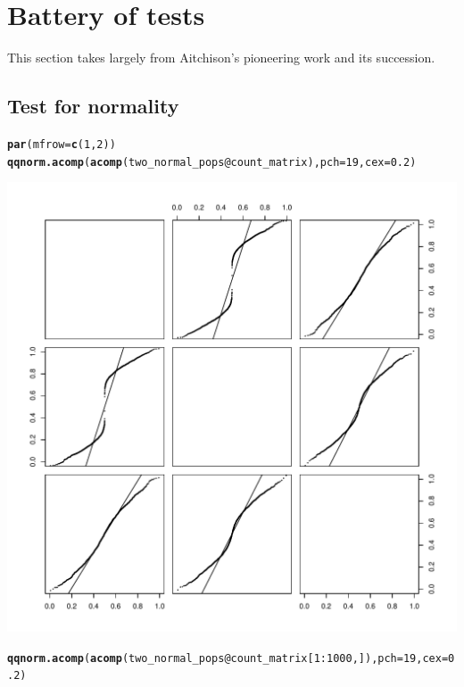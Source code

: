 \documentclass{article}\usepackage[]{graphicx}\usepackage[]{color}
\makeatletter
\def\maxwidth{ %
  \ifdim\Gin@nat@width>\linewidth
    \linewidth
  \else
    \Gin@nat@width
  \fi
}
\newcommand{\hlnum}[1]{\textcolor[rgb]{0.686,0.059,0.569}{#1}}%
\newcommand{\hlopt}[1]{\textcolor[rgb]{0,0,0}{#1}}%
\newcommand{\hlstd}[1]{\textcolor[rgb]{0.345,0.345,0.345}{#1}}%
\newcommand{\hlkwc}[1]{\textcolor[rgb]{0.333,0.667,0.333}{#1}}%
\newcommand{\hlkwd}[1]{\textcolor[rgb]{0.737,0.353,0.396}{\textbf{#1}}}%
\newenvironment{kframe}{%
 \def\at@end@of@kframe{}%
 \ifinner\ifhmode%
  \def\at@end@of@kframe{\end{minipage}}%
  \begin{minipage}{\columnwidth}%
 \fi\fi%
 \def\FrameCommand##1{\hskip\@totalleftmargin \hskip-\fboxsep
 \colorbox{shadecolor}{##1}\hskip-\fboxsep
     \hskip-\linewidth \hskip-\@totalleftmargin \hskip\columnwidth}%
 \MakeFramed {\advance\hsize-\width
   \@totalleftmargin\z@ \linewidth\hsize
   \@setminipage}}%
 {\par\unskip\endMakeFramed%
 \at@end@of@kframe}
\newenvironment{knitrout}{}{} %
\makeatother
\begin{document}
\clearpage
\section{Battery of tests}
This section takes largely from Aitchison's pioneering work\cite{aitchison1982statistical} and its succession\cite{pawlowsky2015modeling}.

\subsection{Test for normality}
\begin{knitrout}
\color{fgcolor}\begin{kframe}
\begin{alltt}
\hlkwd{par}\hlstd{(}\hlkwc{mfrow}\hlstd{=}\hlkwd{c}\hlstd{(}\hlnum{1}\hlstd{,}\hlnum{2}\hlstd{))}
\hlkwd{qqnorm.acomp}\hlstd{(}\hlkwd{acomp}\hlstd{(two_normal_pops}\hlopt{@}\hlkwc{count_matrix}\hlstd{),} \hlkwc{pch}\hlstd{=}\hlnum{19}\hlstd{,} \hlkwc{cex}\hlstd{=}\hlnum{0.2}\hlstd{)}
\end{alltt}
\end{kframe}
\includegraphics[width=\maxwidth]{figure/unnamed-chunk-11-1} 
\begin{kframe}\begin{alltt}
\hlkwd{qqnorm.acomp}\hlstd{(}\hlkwd{acomp}\hlstd{(two_normal_pops}\hlopt{@}\hlkwc{count_matrix}\hlstd{[}\hlnum{1}\hlopt{:}\hlnum{1000}\hlstd{,]),} \hlkwc{pch}\hlstd{=}\hlnum{19}\hlstd{,} \hlkwc{cex}\hlstd{=}\hlnum{0.2}\hlstd{)}

\end{alltt}
\end{kframe}
\end{knitrout}
\end{document}

